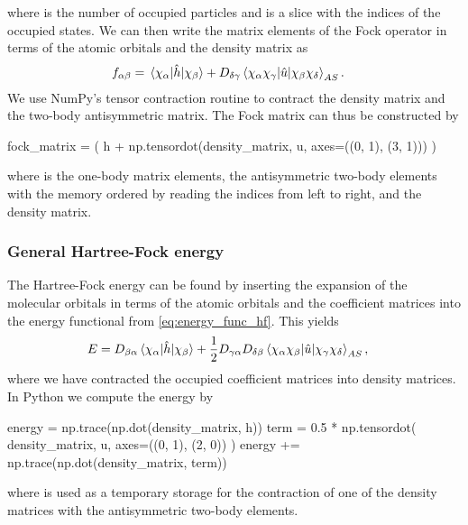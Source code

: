             where  is the number of occupied particles and  is a
            slice with the indices of the occupied states.
            We can then write the matrix elements of the Fock operator in terms
            of the atomic orbitals and the density matrix as
            \begin{align}
                f_{\alpha\beta}
                &= \mel*{\chi_{\alpha}}{\hat{h}}{\chi_{\beta}}
                +
                D_{\delta\gamma}
                \mel*{\chi_{\alpha}\chi_{\gamma}}{
                    \hat{u}
                }{\chi_{\beta}\chi_{\delta}}_{AS}.
                \label{eq:ghf-fock-matrix}
            \end{align}
            We use NumPy's tensor contraction routine  to
            contract the density matrix and the two-body antisymmetric matrix.
            The Fock matrix can thus be constructed by
            \begin{python}
fock_matrix = (
    h + np.tensordot(density_matrix, u, axes=((0, 1), (3, 1)))
)
            \end{python}
            where  is the one-body matrix elements,  the
            antisymmetric two-body elements with the memory ordered by reading
            the indices from left to right, and  the
            density matrix.

            \subsubsection{General Hartree-Fock energy}
                The Hartree-Fock energy can be found by inserting the expansion
                of the molecular orbitals in terms of the atomic orbitals and
                the coefficient matrices into the energy functional from
                \autoref{eq:energy_func_hf}.
                This yields
                \begin{align}
                    E
                    &=
                    D_{\beta\alpha}
                    \mel*{\chi_{\alpha}}{\hat{h}}{\chi_{\beta}}
                    + \frac{1}{2}
                    D_{\gamma\alpha} D_{\delta\beta}
                    \mel*{\chi_{\alpha}\chi_{\beta}}{
                        \hat{u}
                    }{\chi_{\gamma}\chi_{\delta}}_{AS},
                    \label{eq:general-hartree-fock-energy}
                \end{align}
                where we have contracted the occupied coefficient matrices into
                density matrices.
                In Python we compute the energy by
                \begin{python}
energy = np.trace(np.dot(density_matrix, h))
term = 0.5 * np.tensordot(
    density_matrix, u, axes=((0, 1), (2, 0))
)
energy += np.trace(np.dot(density_matrix, term))
                \end{python}
                where  is used as a temporary storage for the
                contraction of one of the density matrices with the
                antisymmetric two-body elements.

